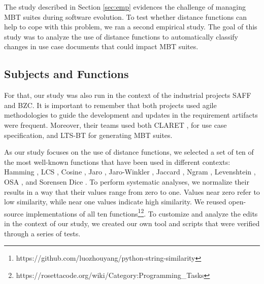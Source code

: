 The study described in Section \ref{sec:emp} evidences the challenge of managing MBT suites during software evolution. To test whether distance functions can help to cope with this problem, we ran a second empirical study. The goal of this study was to analyze the use of distance functions to automatically classify changes in use case documents that could impact MBT suites. 

\subsection{Subjects and Functions}
For that, our study was also run in the context of the industrial projects SAFF and BZC. 
It is important to remember that both projects used agile methodologies to guide the development and updates in the requirement artifacts were frequent. Moreover, their teams used both CLARET \citep{dalton2017claret}, for use case specification, and LTS-BT \citep{cartaxo2008lts} for generating MBT suites. 


As our study focuses on the use of distance functions, we selected a set of ten of the most well-known functions that have been used in different contexts: Hamming \citep{hamming1950error}, LCS \citep{han2007efficient:LCS}, Cosine \citep{huang2008similaritycosine}, Jaro \citep{de1mahalanobis:jaro}, Jaro-Winkler \citep{de1mahalanobis:jaro}, Jaccard \citep{Lu2013SimilaridadeJaccard}, Ngram \citep{Kondrak2005ngram}, Levenshtein \citep{Levenshtein_SPD66}, OSA \citep{Damerau:1964}, and Sorensen Dice \citep{sorensen1948method}. To perform systematic analyses, we normalize their results in a way that their values range from zero to one. Values near zero refer to low similarity, while near one values indicate high similarity. We reused open-source implementations of all ten functions\footnote{https://github.com/luozhouyang/python-string-similarity}\footnote{https://rosettacode.org/wiki/Category:Programming\_Tasks}. To customize and analyze the edits in the context of our study, we created our own tool and scripts that were verified through a series of tests.

